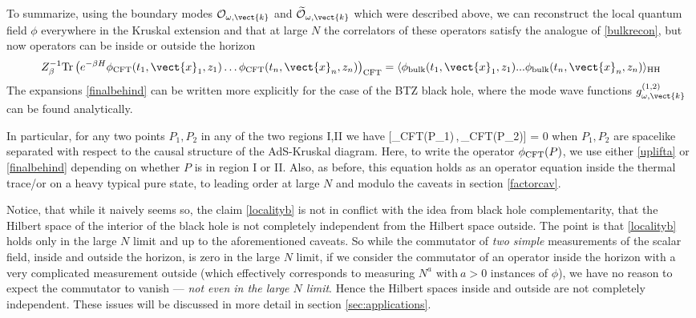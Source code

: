 To summarize, using the boundary modes ${\cal O}_{\omega,\vect{k}}$ and $\widetilde{\cal O}_{\omega,\vect{k}}$ which were described above, we can reconstruct the local quantum field $\phi$ everywhere in the Kruskal extension and that at large $N$ the correlators of these operators satisfy the analogue of \eqref{bulkrecon}, but now operators can be inside or outside the horizon
\begin{equation}
\label{bulkreconb}
Z_{\beta}^{-1}{\rm Tr}\left(e^{-\beta H} \phi_{\text{CFT}}(t_1,\vect{x}_1,z_1) \ldots \phi_{\text{CFT}}(t_n,\vect{x}_n,z_n)\right)_{\text{CFT}}  = \langle \phi_{\text{bulk}}(t_1,\vect{x}_1,z_1)...\phi_{\text{bulk}}(t_n,\vect{x}_n,z_n)\rangle_{\rm HH}
\end{equation}
The expansions \eqref{finalbehind} can be written more explicitly for the case of the BTZ black hole, where the mode wave functions $g_{\omega,\vect{k}}^{(1,2)}$ can be found analytically.

In particular, for any two points $P_1,P_2$ in any of the two regions I,II we have
\be
\label{localityb}
 [\phi_{\rm CFT}(P_1)\,,\,\phi_{\rm CFT}(P_2)] = 0
\ee
when $P_1,P_2$ are spacelike separated with respect to the causal structure of the AdS-Kruskal diagram. Here, to write the operator $\phi_{\rm CFT}(P)$, we use either \eqref{uplifta} or \eqref{finalbehind} depending
on whether $P$ is in region I or II. Also, as before, this equation holds as an operator equation inside the thermal trace/or on a heavy
typical pure state, to leading order at large $N$ and modulo the caveats in section \ref{factorcav}.

Notice, that while it naively seems so, the claim \eqref{localityb} is not in conflict with the idea from black hole complementarity, that the Hilbert space of the interior of the black hole is not completely
independent from the Hilbert space outside. The point is that \eqref{localityb} holds only in the 
large $N$ limit and up to the aforementioned caveats. So while the commutator of {\it two simple} measurements of the scalar field, inside and outside the horizon, is zero in 
the large $N$ limit, if we consider the commutator of an operator inside the horizon with a very complicated measurement outside (which effectively corresponds to measuring $N^{a}\,\,\text{with}~ a>0$ instances of $\phi$), we have no reason to expect the commutator to vanish --- {\it not even in the large $N$ limit}. Hence the Hilbert
spaces inside and outside are not completely independent. These issues will be discussed in more detail in section \ref{sec:applications}.


 


